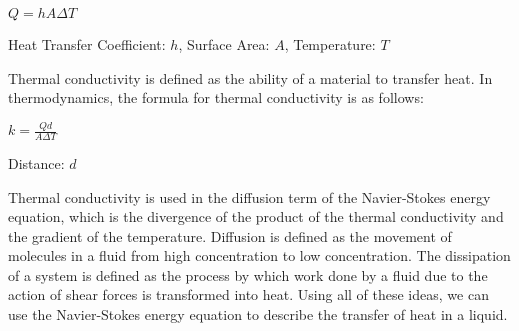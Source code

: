 \documentclass[12pt]{article}
\begin{document}
\begin{center}$ Q = hA\Delta T$\end{center}
\begin{center}Heat Transfer Coefficient: $h$, Surface Area: $A$, Temperature: $T$\end{center}

Thermal conductivity is defined as the ability of a material to transfer heat. In thermodynamics, the formula for thermal conductivity is as follows:

\begin{center} $k = \frac{Qd}{A\Delta T}$
\end{center}
\begin{center} Distance: $d$
\end{center}

Thermal conductivity is used in the diffusion term of the Navier-Stokes energy equation, which is the divergence of the product of the thermal conductivity and the gradient of the temperature. Diffusion is defined as the movement of molecules in a fluid from high concentration to low concentration. The dissipation of a system is defined as the process by which work done by a fluid due to the action of shear forces is transformed into heat. Using all of these ideas, we can use the Navier-Stokes energy equation to describe the transfer of heat in a liquid.
\end{document}
